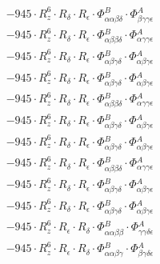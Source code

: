 \documentclass{article}
\begin{document}
\begin{subequations}
\begin{gather}
\begin{array}{c}
 \\[0.2em] 		 - 945 \cdot R_{z}^{6} \cdot R_{\delta{}} \cdot R_{\epsilon{}} \cdot \Phi{}^{B}_{\alpha{}\alpha{}\beta{}\delta{}} \cdot \Phi{}^{A}_{\beta{}\gamma{}\gamma{}\epsilon{}} 
 \\[0.2em] 		 - 945 \cdot R_{z}^{6} \cdot R_{\delta{}} \cdot R_{\epsilon{}} \cdot \Phi{}^{B}_{\alpha{}\beta{}\beta{}\delta{}} \cdot \Phi{}^{A}_{\alpha{}\gamma{}\gamma{}\epsilon{}} 
 \\[0.2em] 		 - 945 \cdot R_{z}^{6} \cdot R_{\delta{}} \cdot R_{\epsilon{}} \cdot \Phi{}^{B}_{\alpha{}\beta{}\gamma{}\delta{}} \cdot \Phi{}^{A}_{\alpha{}\beta{}\gamma{}\epsilon{}} 
 \\[0.2em] 		 - 945 \cdot R_{z}^{6} \cdot R_{\delta{}} \cdot R_{\epsilon{}} \cdot \Phi{}^{B}_{\alpha{}\beta{}\gamma{}\delta{}} \cdot \Phi{}^{A}_{\alpha{}\beta{}\gamma{}\epsilon{}} 
 \\[0.2em] 		 - 945 \cdot R_{z}^{6} \cdot R_{\delta{}} \cdot R_{\epsilon{}} \cdot \Phi{}^{B}_{\alpha{}\beta{}\beta{}\delta{}} \cdot \Phi{}^{A}_{\alpha{}\gamma{}\gamma{}\epsilon{}} 
 \\[0.2em] 		 - 945 \cdot R_{z}^{6} \cdot R_{\delta{}} \cdot R_{\epsilon{}} \cdot \Phi{}^{B}_{\alpha{}\beta{}\gamma{}\delta{}} \cdot \Phi{}^{A}_{\alpha{}\beta{}\gamma{}\epsilon{}} 
 \\[0.2em] 		 - 945 \cdot R_{z}^{6} \cdot R_{\delta{}} \cdot R_{\epsilon{}} \cdot \Phi{}^{B}_{\alpha{}\beta{}\gamma{}\delta{}} \cdot \Phi{}^{A}_{\alpha{}\beta{}\gamma{}\epsilon{}} 
 \\[0.2em] 		 - 945 \cdot R_{z}^{6} \cdot R_{\delta{}} \cdot R_{\epsilon{}} \cdot \Phi{}^{B}_{\alpha{}\beta{}\beta{}\delta{}} \cdot \Phi{}^{A}_{\alpha{}\gamma{}\gamma{}\epsilon{}} 
 \\[0.2em] 		 - 945 \cdot R_{z}^{6} \cdot R_{\delta{}} \cdot R_{\epsilon{}} \cdot \Phi{}^{B}_{\alpha{}\beta{}\gamma{}\delta{}} \cdot \Phi{}^{A}_{\alpha{}\beta{}\gamma{}\epsilon{}} 
 \\[0.2em] 		 - 945 \cdot R_{z}^{6} \cdot R_{\delta{}} \cdot R_{\epsilon{}} \cdot \Phi{}^{B}_{\alpha{}\beta{}\gamma{}\delta{}} \cdot \Phi{}^{A}_{\alpha{}\beta{}\gamma{}\epsilon{}} 
 \\[0.2em] 		 - 945 \cdot R_{z}^{6} \cdot R_{\epsilon{}} \cdot R_{\delta{}} \cdot \Phi{}^{B}_{\alpha{}\alpha{}\beta{}\beta{}} \cdot \Phi{}^{A}_{\gamma{}\gamma{}\delta{}\epsilon{}} 
 \\[0.2em] 		 - 945 \cdot R_{z}^{6} \cdot R_{\epsilon{}} \cdot R_{\delta{}} \cdot \Phi{}^{B}_{\alpha{}\alpha{}\beta{}\gamma{}} \cdot \Phi{}^{A}_{\beta{}\gamma{}\delta{}\epsilon{}} 

\end{array}
\end{gather}
\end{subequations}
\end{document}
